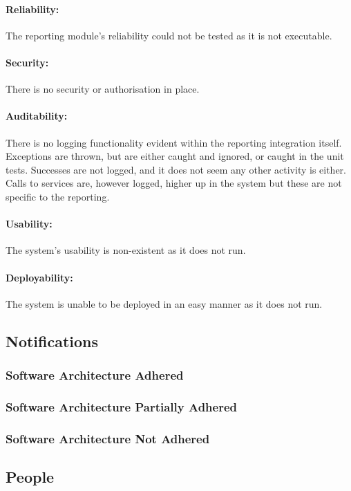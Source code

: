 \documentclass{article}
\begin{document}
        	\paragraph{Reliability:}
            The reporting module's reliability could not be tested as it is not executable.
            \paragraph{Security:}
            There is no security or authorisation in place.
            \paragraph{Auditability:}
            There is no logging functionality evident within the reporting integration itself. Exceptions are thrown, but are either caught and ignored, or caught in the unit tests. Successes are not logged, and it does not seem any other activity is either. Calls to services are, however logged, higher up in the system but these are not specific to the reporting.
			\paragraph{Usability:} The system's usability is non-existent as it does not run.
			\paragraph{Deployability:} The system is unable to be deployed in an easy manner as it does not run.    
        
    \subsection{Notifications}
        \subsubsection{Software Architecture Adhered}
        \subsubsection{Software Architecture Partially Adhered}
        \subsubsection{Software Architecture Not Adhered}       
        
    \subsection{People}
\end{document}
